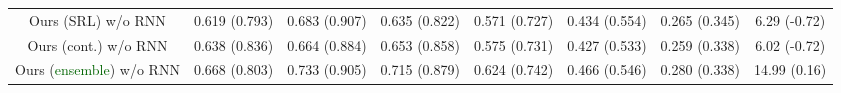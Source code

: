 \documentclass[11pt]{article}
\newcommand{\fone}{$\text{F}_1$\xspace}
\newcommand{\imrc}{iMRC\xspace}
\begin{document}
\begin{table*}
\begin{tabular}{c|ccc|ccc|c}
        Ours (SRL) w/o RNN                              & 0.619 \color{blue}(0.793) & 0.683 \color{blue}(0.907) & 0.635 \color{blue}(0.822) & 0.571 \color{blue}(0.727) & 0.434 \color{blue}(0.554) & 0.265 \color{blue}(0.345) & 6.29 \color{blue}(-0.72) \\
        Ours (cont.) w/o RNN                            & 0.638 \color{blue}(0.836) & 0.664 \color{blue}(0.884) & 0.653 \color{blue}(0.858) & 0.575 \color{blue}(0.731) & 0.427 \color{blue}(0.533) & 0.259 \color{blue}(0.338) & 6.02 \color{blue}(-0.72) \\
        Ours (\textcolor{darkgreen}{ensemble}) w/o RNN  & 0.668 \color{blue}(0.803) & 0.733 \color{blue}(0.905) & 0.715 \color{blue}(0.879) & 0.624 \color{blue}(0.742) & 0.466 \color{blue}(0.546) & 0.280 \color{blue}(0.338) & 14.99 \color{blue}(0.16) \\
        \bottomrule
    \end{tabular}
    \caption{\#Memory slot = 5. Testing \fone in \textbf{black} and sufficient information rewards in \textcolor{blue}{\textbf{blue}}. \%RI represents relative improvement over \imrc on corresponding metric, across settings.}
    \label{tab:result_table_full_slot_5}
\end{table*}
\end{document}
